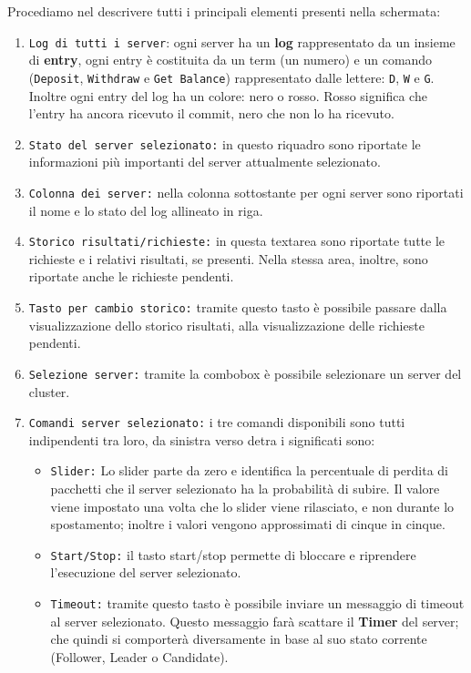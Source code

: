 Procediamo nel descrivere tutti i principali elementi presenti nella schermata:
\begin{enumerate}
	\item \texttt{Log di tutti i server}: 
  ogni server ha un \textbf{log} rappresentato da un insieme di \textbf{entry}, ogni entry è costituita da un term (un numero) e un comando (\texttt{Deposit}, \texttt{Withdraw} e \texttt{Get Balance}) rappresentato dalle lettere: \texttt{D}, \texttt{W} e \texttt{G}. Inoltre ogni entry del log ha un colore: nero o rosso. Rosso significa che l'entry ha ancora ricevuto il commit, nero che non lo ha ricevuto.
	\item \texttt{Stato del server selezionato:}
  in questo riquadro sono riportate le informazioni più importanti del server attualmente selezionato.
	\item \texttt{Colonna dei server:}
  nella colonna sottostante per ogni server sono riportati il nome e lo stato del log allineato in riga.
	\item \texttt{Storico risultati/richieste:}
  in questa textarea sono riportate tutte le richieste e i relativi risultati, se presenti. Nella stessa area, inoltre, sono riportate anche le richieste pendenti.
	\item \texttt{Tasto per cambio storico:}
  tramite questo tasto è possibile passare dalla visualizzazione dello storico risultati, alla visualizzazione delle richieste pendenti.
	\item \texttt{Selezione server:}
  tramite la combobox è possibile selezionare un server del cluster.
	\item \texttt{Comandi server selezionato:}
		i tre comandi disponibili sono tutti indipendenti tra loro, da sinistra verso detra i significati sono:
		\begin{itemize}
			\item \texttt{Slider:} 
      Lo slider parte da zero e identifica la percentuale di perdita di pacchetti che il server selezionato ha la probabilità di subire.
			Il valore viene impostato una volta che lo slider viene rilasciato, e non durante lo spostamento; inoltre i valori vengono approssimati di cinque in cinque.
			\item \texttt{Start/Stop:}
      il tasto start/stop permette di bloccare e riprendere l'esecuzione del server selezionato. 
			\item \texttt{Timeout:}
      tramite questo tasto è possibile inviare un messaggio di timeout al server selezionato. Questo messaggio farà scattare il \textbf{Timer} del server; che quindi si comporterà diversamente in base al suo stato corrente (Follower, Leader o Candidate). 

\end{itemize}
\end{enumerate}
